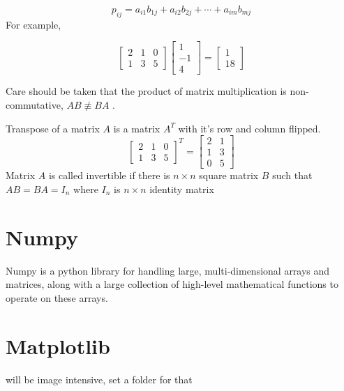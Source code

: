 \begin{equation}
	p_{ij}=a_{i1}b_{1j}+a_{i2}b_{2j}+\cdots+a_{im}b_{mj}
\end{equation}
\noindent For example,

\begin{equation}
	\begin{bmatrix}
		2&1  &0  \\
		1& 3 &5
	\end{bmatrix}
	\begin{bmatrix}
		1 \\
		-1 \\
		4
	\end{bmatrix}=
	\begin{bmatrix}
		1 \\
		18
	\end{bmatrix}
\end{equation}

\noindent Care should be taken that the product of matrix multiplication is non-commutative, $AB\not\equiv BA$ .

\noindent Transpose of a matrix $A$ is a matrix $A^T$ with it's row and column flipped.
\begin{equation}
\begin{bmatrix}
	2&1  &0  \\
	1& 3 &5 
\end{bmatrix}^T=
\begin{bmatrix}
	2& 1 \\
	1& 3 \\
	0&5
\end{bmatrix}
\end{equation}
\noindent Matrix $A$ is called invertible if there is $n\times n$ square matrix $B$ such that $AB=BA=I_n$ where $I_n$ is $n\times n$ identity matrix

\section{Numpy}
Numpy is a python library for handling large, multi-dimensional arrays and matrices, along with a large collection of high-level mathematical functions to operate on these arrays.
\section{Matplotlib}
will be image intensive, set a folder for that